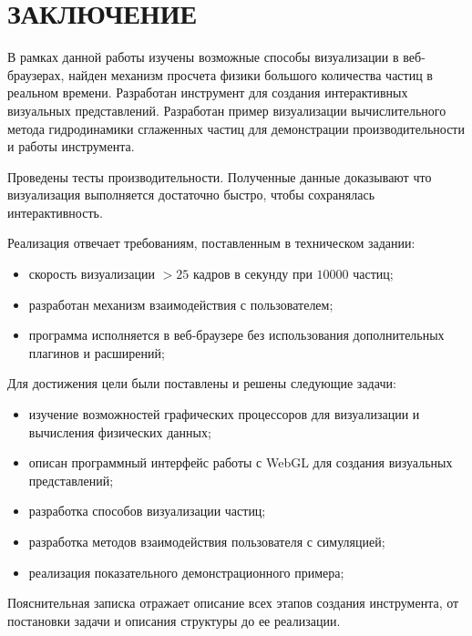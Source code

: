 \newpage
\section*{ЗАКЛЮЧЕНИЕ}

В рамках данной работы изучены возможные способы визуализации в веб-браузерах,
найден механизм просчета физики большого количества частиц в реальном времени.
Разработан инструмент для создания интерактивных визуальных представлений.
Разработан пример визуализации вычислительного метода гидродинамики сглаженных 
частиц для демонстрации производительности и работы инструмента.

Проведены тесты производительности. Полученные данные доказывают что визуализация
выполняется достаточно быстро, чтобы сохранялась интерактивность.

Реализация отвечает требованиям, поставленным в техническом задании:

\begin{itemize}
  \item скорость визуализации $>25$ кадров в секунду при $10000$ частиц;
  \item разработан механизм взаимодействия с пользователем;
  \item программа исполняется в веб-браузере без использования дополнительных 
    плагинов и расширений;
\end{itemize}

Для достижения цели были поставлены и решены следующие задачи:

\begin{itemize}
  \item изучение возможностей графических процессоров для визуализации
    и вычисления физических данных;
  \item описан программный интерфейс работы с WebGL для создания
    визуальных представлений;
  \item разработка способов визуализации частиц;
  \item разработка методов взаимодействия пользователя с симуляцией;
  \item реализация показательного демонстрационного примера;
\end{itemize}

Пояснительная записка отражает описание всех этапов создания инструмента,
от постановки задачи и описания структуры до ее реализации.
